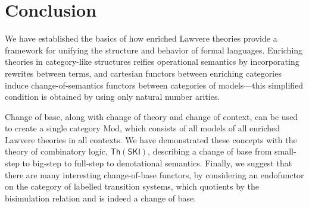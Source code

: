 \documentclass{amsart}
\theoremstyle{definition}
\newcommand{\Th}{\mathsf{Th}}
\begin{document}
\section{Conclusion}
\label{sec:conclusion}

We have established the basics of how enriched Lawvere theories provide a framework for unifying the structure and behavior of formal languages. Enriching theories in category-like structures reifies operational semantics by incorporating rewrites between terms, and cartesian functors between enriching categories induce change-of-semantics functors between categories of models---this simplified condition is obtained by using only natural number arities.

Change of base, along with change of theory and change of context, can be used to create
a single category $\mathrm{Mod}$, which consists of all models of all enriched Lawvere theories in all contexts. We have demonstrated these concepts with the theory of combinatory logic, $\Th(\mathsf{SKI})$, describing a change of base from small-step to big-step to full-step to denotational semantics. Finally, we suggest that there are many interesting change-of-base functors, by considering an endofunctor on the category of labelled transition systems, which quotients by the bisimulation relation and is indeed a change of base.
\end{document}
